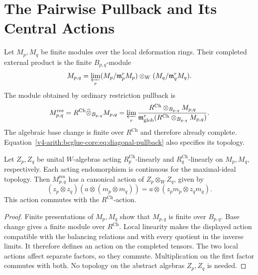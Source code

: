 \section{The Pairwise Pullback and Its Central Actions}
\label{v4-arith:bcglue-core:local}

\begin{definition}
\label{v4-arith:bcglue-core:def:diagonal-pullback}
Let $M_p,M_q$ be finite modules over the local deformation rings.
Their completed external product is the finite $B_{p,q}$-module
\[
 M_{p,q}=\varprojlim_r
 (M_p/\mathfrak m_p^rM_p)\otimes_W
 (M_q/\mathfrak m_q^rM_q).
\]
The module obtained by ordinary restriction pullback is
\begin{equation}
\label{v4-arith:bcglue-core:eq:diagonal-pullback}
 M_{p,q}^{\mathrm{res}}
 =R^{\mathrm{Ch}}\widehat\otimes_{B_{p,q}}M_{p,q}
 =\varprojlim_r
 \frac{R^{\mathrm{Ch}}\otimes_{B_{p,q}}M_{p,q}}
 {\mathfrak m_{\mathrm{glob}}^r
       (R^{\mathrm{Ch}}\otimes_{B_{p,q}}M_{p,q})}.
\end{equation}
The algebraic base change is finite over $R^{\mathrm{Ch}}$ and
therefore already complete. Equation~\eqref{v4-arith:bcglue-core:eq:diagonal-pullback}
also specifies its topology.
\end{definition}

\begin{proposition}
\label{v4-arith:bcglue-core:def:bernstein-product-action}
\label{v4-arith:bcglue-core:prop:formal-pullback-action}
Let $Z_p,Z_q$ be unital $W$-algebras acting
$R_p^{\mathrm{Ch}}$-linearly and $R_q^{\mathrm{Ch}}$-linearly on
$M_p,M_q$, respectively. Each acting endomorphism is continuous
for the maximal-ideal topology. Then $M_{p,q}^{\mathrm{res}}$ has
a canonical action of $Z_p\otimes_W Z_q$, given by
\[
 (z_p\otimes z_q)(a\otimes(m_p\otimes m_q))
   =a\otimes(z_pm_p\otimes z_qm_q).
\]
This action commutes with the $R^{\mathrm{Ch}}$-action.
\end{proposition}

\begin{proof}
Finite presentations of $M_p,M_q$ show that $M_{p,q}$ is finite
over $B_{p,q}$. Base change gives a finite module over
$R^{\mathrm{Ch}}$. Local linearity makes the displayed action
compatible with the balancing relations and with every quotient
in the inverse limits. It therefore defines an action on the
completed tensors. The two local actions affect separate factors,
so they commute. Multiplication on the first factor commutes with
both. No topology on the abstract algebras $Z_p,Z_q$ is needed.
\end{proof}

